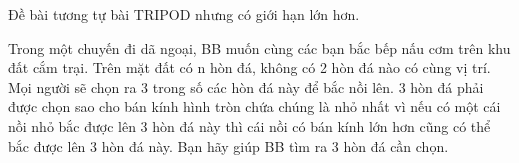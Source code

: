 Đề bài tương tự bài TRIPOD nhưng có giới hạn lớn hơn.   


   Trong một chuyến đi dã ngoại, BB muốn cùng các bạn bắc bếp nấu cơm trên khu đất cắm trại. Trên mặt đất có n hòn đá, không có 2 hòn đá nào có cùng vị trí. Mọi người sẽ chọn ra 3 trong số các hòn đá này để bắc nồi lên. 3 hòn đá phải được chọn sao cho bán kính hình tròn chứa chúng là nhỏ nhất vì nếu có một cái nồi nhỏ bắc được lên 3 hòn đá này thì cái nồi có bán kính lớn hơn cũng có thể bắc được lên 3 hòn đá này. Bạn hãy giúp BB tìm ra 3 hòn đá cần chọn.